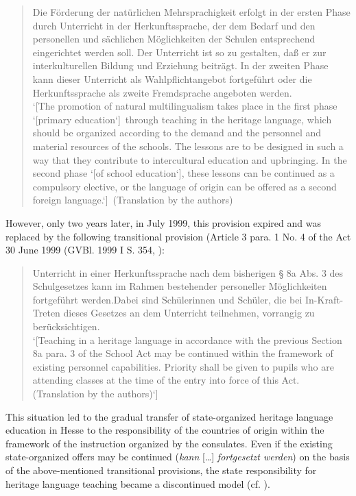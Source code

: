 \documentclass[output=paper,colorlinks,citecolor=brown]{langscibook}
\begin{document}
\begin{quote}
    Die Förderung der natürlichen Mehrsprachigkeit erfolgt in der ersten Phase durch Unterricht in der Herkunftssprache, der dem Bedarf und den personellen und sächlichen Möglichkeiten der Schulen entsprechend eingerichtet werden soll. Der Unterricht ist so zu gestalten, daß er zur interkulturellen Bildung und Erziehung beiträgt. In der zweiten Phase kann dieser Unterricht als Wahlpflichtangebot fortgeführt oder die Herkunftssprache als zweite Fremdsprache angeboten werden.\\ 
    \char`[The promotion of natural multilingualism takes place in the first phase \char`[primary education\char`]\ through teaching in the heritage language, which should be organized according to the demand and the personnel and material resources of the schools. The lessons are to be designed in such a way that they contribute to intercultural education and upbringing. In the second phase \char`[of school education\char`], these lessons can be continued as a compulsory elective, or the language of origin can be offered as a second foreign language.\char`]\ (Translation by the authors)
\end{quote}


However, only two years later, in July 1999, this provision expired and was replaced by the following transitional provision (Article 3 para. 1 No. 4 of the Act 30 June 1999 (GVBl. 1999 I S. 354, \citealt{gvbl1999}):

\begin{quote}
    Unterricht in einer Herkunftssprache nach dem bisherigen § 8a Abs. 3 des Schulgesetzes kann im Rahmen bestehender personeller Möglichkeiten fortgeführt werden.Dabei sind Schülerinnen und Schüler, die bei In-Kraft-Treten dieses Gesetzes an dem Unterricht teilnehmen, vorrangig zu berücksichtigen. \\
    \char`[Teaching in a heritage language in accordance with the previous Section 8a para. 3 of the School Act may be continued within the framework of existing personnel capabilities. Priority shall be given to pupils who are attending classes at the time of the entry into force of this Act. (Translation by the authors)\char`]
\end{quote}

This situation led to the gradual transfer of state-organized heritage language education in Hesse to the responsibility of the countries of origin within the framework of the instruction organized by the consulates. Even if the existing state-organized offers may be continued (\textit{kann} […] \textit{fortgesetzt werden}) on the basis of the above-mentioned transitional provisions, the state responsibility for heritage language teaching became a discontinued model (cf. \citealt{koller2012}).
\end{document}
